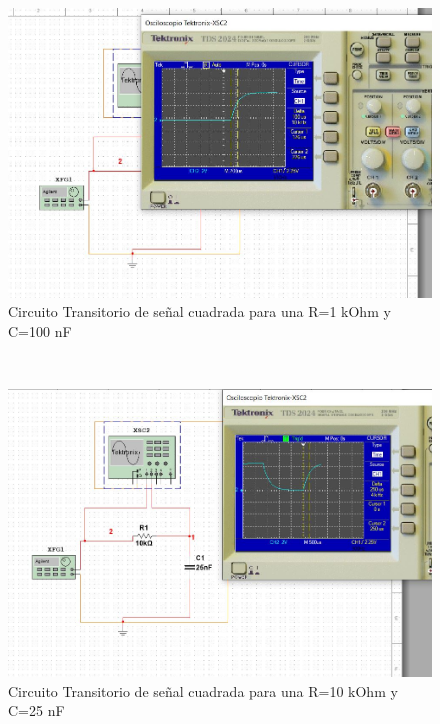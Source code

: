 \documentclass[twoside,twocolumn]{article}
\begin{document}
    \begin{figure}[h]
    \centering
    \includegraphics[scale=0.2]{Imagenes/4.1.JPG}
    \caption{Circuito Transitorio de señal cuadrada para una R=1 kOhm y C=100 nF}
    \label{fig:circuito1}
  \end{figure}\\  

    \begin{figure}[h]
    \centering
    \includegraphics[scale=0.2]{Imagenes/4.2.JPG}
    \caption{Circuito Transitorio de señal cuadrada para una R=10 kOhm y C=25 nF}
    \label{fig:circuito1}
  \end{figure}\\    
  
\end{document}
